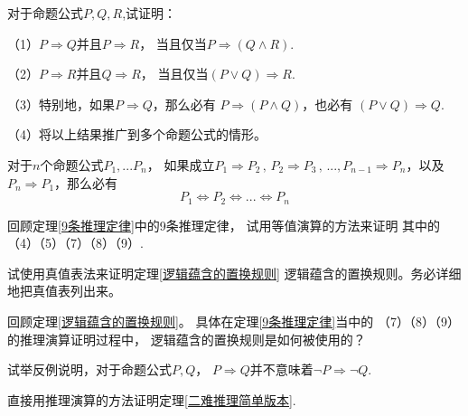\begin{prob}对于命题公式$P,Q,R$,试证明：

（1）$P\Rightarrow Q$并且$P\Rightarrow R$，
当且仅当$P\Rightarrow(Q\wedge R)$.

（2）$P\Rightarrow R$并且$Q\Rightarrow R$，
当且仅当$(P\vee Q)\Rightarrow R$.

（3）特别地，如果$P\Rightarrow Q$，那么必有
$P\Rightarrow(P\wedge Q)$，也必有
$(P\vee Q)\Rightarrow Q$.

（4）将以上结果推广到多个命题公式的情形。
\end{prob}\vs

\begin{prob}[循环论证]
对于$n$个命题公式$P_1,...P_n$，
如果成立$P_1\Rightarrow P_2\,,\,P_2\Rightarrow P_3\,,\,...,
P_{n-1}\Rightarrow P_n$，以及$P_n\Rightarrow P_1$，那么必有
$$P_1\Leftrightarrow P_2
\Leftrightarrow...\Leftrightarrow P_n$$
\end{prob}\vs

\begin{prob}[基本推理定律的验证]
回顾定理\ref{9条推理定律}中的9条推理定律，
试用等值演算的方法来证明
其中的（4）（5）（7）（8）（9）.
\end{prob}\vs

\begin{prob}[真值表法的尝试]
试使用真值表法来证明定理\ref{逻辑蕴含的置换规则}
逻辑蕴含的置换规则。务必详细地把真值表列出来。
\end{prob}\vs

\begin{prob}[逻辑蕴含的置换规则的使用]
回顾定理\ref{逻辑蕴含的置换规则}。
具体在定理\ref{9条推理定律}当中的
（7）（8）（9）的推理演算证明过程中，
逻辑蕴含的置换规则是如何被使用的？
\end{prob}\vs

\begin{prob}试举反例说明，对于命题公式$P,Q$，
$P\Rightarrow Q$并不意味着$\neg P\Rightarrow \neg Q$.
\end{prob}\vs

\begin{prob}[二难推理简单版本]
直接用推理演算的方法证明定理\ref{二难推理简单版本}.
\end{prob}\vs

